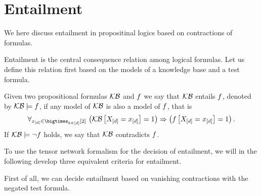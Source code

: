 \section{Entailment}

We here discuss entailment in propositinal logics based on contractions of formulas.

Entailment is the central consequence relation among logical formulas.
Let us define this relation first based on the models of a knowledge base and a test formula.

\begin{definition}
    \label{def:logicalEntailment}
    Given two propositional formulas $\mathcal{KB}$ and $f$ we say that $\mathcal{KB}$ entails $f$, denoted by $\mathcal{KB}\models f$, if any model of $\mathcal{KB}$ is also a model of $f$, that is
    \begin{align*}
        \uniquantwrtof{\shortatomindicesin}{\imppremhead{\kbat{\indexedshortcatvariables}=1}{\formulaat{\indexedshortcatvariables}=1}} \, .
    \end{align*}
    If $\mathcal{KB}\models\lnot f$ holds, we say that $\mathcal{KB}$ contradicts $f$.
\end{definition}

To use the tensor network formalism for the decision of entailment, we will in the following develop three equivalent criteria for entailment. %


First of all, we can decide entailment based on vanishing contractions with the negated test formula.

